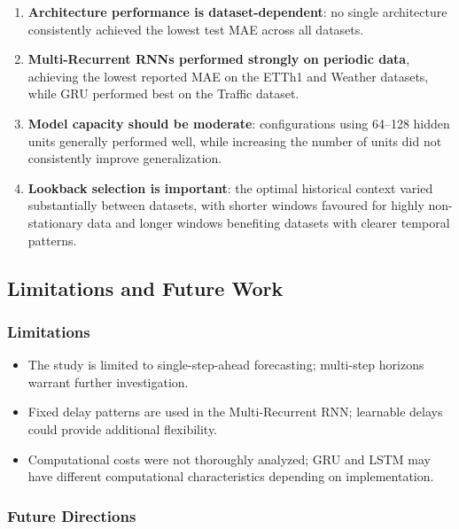 \documentclass[conference]{IEEEtran}
\begin{document}
\begin{enumerate}

    \item \textbf{Architecture performance is dataset-dependent}: no
    single architecture consistently achieved the lowest test
    MAE across all datasets.

    \item \textbf{Multi-Recurrent RNNs performed strongly on periodic
    data}, achieving the lowest reported MAE on the ETTh1 and
    Weather datasets, while GRU performed best on the Traffic dataset.

    \item \textbf{Model capacity should be moderate}: configurations
    using 64--128 hidden units generally performed well, while increasing
    the number of units did not consistently improve generalization.

    \item \textbf{Lookback selection is important}: the optimal historical
    context varied substantially between datasets, with shorter windows
    favoured for highly non-stationary data and longer windows benefiting
    datasets with clearer temporal patterns.

\end{enumerate}

\newpage
\subsection{Limitations and Future Work}
\subsubsection{Limitations}

\begin{itemize}
    \item The study is limited to single-step-ahead forecasting; multi-step horizons warrant further investigation.
    
    \item Fixed delay patterns are used in the Multi-Recurrent RNN; learnable delays could provide additional flexibility.
    
    \item Computational costs were not thoroughly analyzed; GRU and LSTM may have different computational characteristics depending on implementation.
\end{itemize}

\subsubsection{Future Directions}
\end{document}
